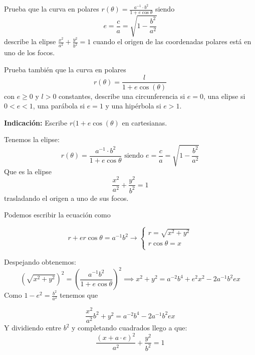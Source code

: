 \begin{problem}[3]
Prueba que la curva en polares $r(\theta)= \frac{a^{-1} \cdot b^2}{1 + e\cos\theta}$ siendo
\[ e = \frac{c}{a} = \sqrt{1 - \frac{b^2}{a^2}}\]
describe la elipse $\frac{x^2}{a^2} + \frac{y^2}{b^2} = 1$ cuando el origen de las coordenadas polares está en uno de los focos.

Prueba también que la curva en polares
\[r(\theta)=\frac{l}{1+e\cos(\theta)}\]
con $e \geq 0$ y $l>0$ constantes, describe una circunferencia si $e=0$, una elipse si $0<e<1$, una parábola si $e=1$ y una hipérbola si $e>1$.

\textbf{Indicación:} Escribe $r(1+e\cos(\theta)$ en cartesianas.

\solution

	Tenemos la elipse:$$r(\theta)= \frac{a^{-1} \cdot b^2}{1 + e\cos\theta} \text{  siendo  } e = \frac{c}{a} = \sqrt{1 - \frac{b^2}{a^2}}$$
		Que es la elipse $$\frac{x^2}{a^2} + \frac{y^2}{b^2} = 1$$ trasladando el origen a uno de sus focos.

		Podemos escribir la ecuación como

		$$ r + er\cos\theta = a^{-1} b^2 \rightarrow
		\begin{cases}
		r = \sqrt{x^2 + y^2}\\
		r\cos\theta = x\\
		\end{cases}$$

		Despejando obtenemos:
		\[(\sqrt{x^2 + y^2})^2 = (\frac{a^{-1}b^2}{1+e\cos\theta})^2 \implies x^2 + y^2 = a^{-2} b^4 + e^2x^2 - 2a^{-1}b^2ex\]
		Como $1-e^2 = \frac{b^2}{a^2}$ tenemos que

		$$\frac{x^2}{a^2}b^2 + y^2 = a^{-2} b^4 - 2a^{-1}b^2ex$$
		Y dividiendo entre $b^2$ y completando cuadrados llego a que:
		$$\frac{(x + a\cdot e)^2}{a^2} + \frac{y^2}{b^2} = 1$$
\end{problem}


